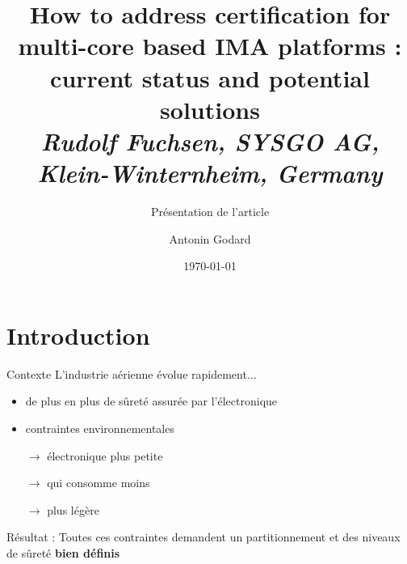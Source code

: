 \documentclass{beamer}
\begin{document}
\title[How to address certification for multi-core based IMA platforms :
       current status and potential solutions]{How to address certification for multi-core based IMA platforms :
       current status and potential solutions \\
   {\small \textit{Rudolf Fuchsen, SYSGO AG, Klein-Winternheim, Germany \cite{Fuch}}}} 
\subtitle{\vspace{1em} Présentation de l'article}
\author{ \vspace{4em} Antonin Godard} 
\date{\today} 

\begin{frame}[plain]
  \titlepage
\end{frame}



\section{Introduction}%
\label{sec:introduction}

\begin{frame}{Contexte}
	L'industrie aérienne évolue rapidement... 
	\begin{itemize}
		\item de plus en plus de sûreté assurée par l'électronique
		\item contraintes environnementales\pause
		\item[$\rightarrow$] électronique plus petite
		\item[$\rightarrow$] qui consomme moins
		\item[$\rightarrow$] plus légère\pause
	\end{itemize}
	
	\begin{alertblock}{Résultat :}
		Toutes ces contraintes demandent un partitionnement et des niveaux de sûreté
		\textbf{bien définis}
	\end{alertblock}

\end{frame}
\end{document}
